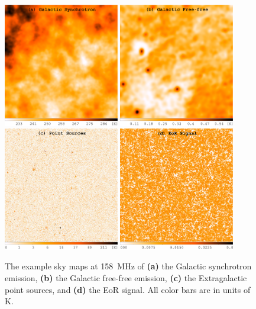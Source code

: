 \documentclass[modern]{aastex62}
\begin{document}
\begin{figure}
  \centering
  \includegraphics[width=0.45\textwidth]{gsyn-f158-heat}
  \includegraphics[width=0.45\textwidth]{gff-f158-heat} \\
  \includegraphics[width=0.45\textwidth]{pointsources-f158-heat-log}
  \includegraphics[width=0.45\textwidth]{21cm-f158-heat}
  \caption{\label{fig:gsyn-gff-ps-21cm}%
    The example sky maps at \SI{158}{\MHz} of
    \textbf{(a)} the Galactic synchrotron emission,
    \textbf{(b)} the Galactic free-free emission,
    \textbf{(c)} the Extragalactic point sources,
    and
    \textbf{(d)} the EoR signal.
    All color bars are in units of \si{\kelvin}.
  }
\end{figure}
\end{document}
